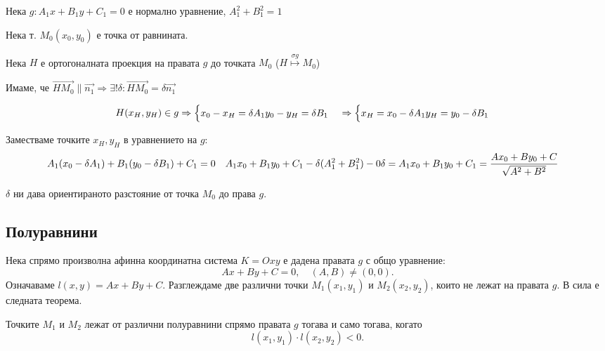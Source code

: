\documentclass{article}
\renewcommand{\\}{\newline}
\begin{document}
Нека \(g: A_1x + B_1y + C_1 = 0\) е нормално уравнение, \(A_1^{2} + B_{1}^{2} = 1\)  

Нека т. \(M_0(x_0, y_0)\)  е точка от равнината.

Нека \(H\) е ортогоналната проекция на правата \(g\) до точката \(M_0\) (\(H \overset{\sigma g}{\mapsto}M_0\))

Имаме, че \(\overrightarrow{HM_0} \parallel \overrightarrow{n_1} \Rightarrow \exists! \delta: \overrightarrow{HM_0} = \delta \overrightarrow{n_1}\) 

\[
  H(x_H, y_H) \in g \Rightarrow \begin{cases}
    x_0 - x_H = \delta A_1 \\ 
    y_0 - y_H = \delta B_1 
  \end{cases} \Rightarrow \begin{cases}
    x_H = x_0 - \delta A_1 \\ 
    y_H = y_0 - \delta B_1
  \end{cases}
\] 

Заместваме точките \(x_H, y_H\) в уравнението на \(g\):
\begin{align*}
&A_{1}(x_0 - \delta A_1) + B_1(y_0 - \delta B_1) + C_1 = 0 \\
&A_{1}x_0 + B_{1}y_0 + C_1 -\delta(A_{1}^{2} + B_{1}^{2}) - 0 \\ 
  \delta &= A_{1}x_0 + B_{1}y_0 + C_1 = \frac{Ax_0 + By_0 + C}{\sqrt{A^{2} + B^{2}}}
\end{align*}

\(\delta\)  ни дава ориентираното разстояние от точка \(M_0\) до права \(g\).    

\subsection{Полуравнини}

Нека спрямо произволна афинна координатна система $K = Oxy$ е дадена правата $g$ с общо уравнение:
\[
Ax + By + C = 0, \quad (A, B) \neq (0, 0).
\]
Означаваме $l(x, y) = Ax + By + C$. Разглеждаме две различни точки $M_1(x_1, y_1)$ и $M_2(x_2, y_2)$, които не лежат на правата $g$. В сила е следната теорема.

Точките $M_1$ и $M_2$ лежат от различни полуравнини спрямо правата $g$ тогава и само тогава, когато
\[
l(x_1, y_1) \cdot l(x_2, y_2) < 0.
\]
\end{document}

